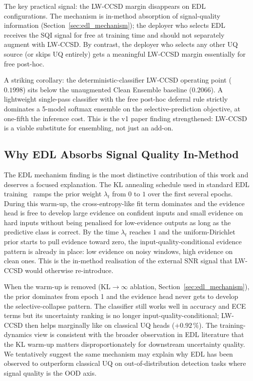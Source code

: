 \documentclass[journal]{IEEEtran}
\begin{document}
The key practical signal: the LW-CCSD margin disappears on EDL configurations. The mechanism is in-method absorption of signal-quality information (Section~\ref{sec:edl_mechanism}); the deployer who selects EDL receives the SQI signal for free at training time and should not separately augment with LW-CCSD. By contrast, the deployer who selects any other UQ source (or skips UQ entirely) gets a meaningful LW-CCSD margin essentially for free post-hoc.

A striking corollary: the deterministic-classifier LW-CCSD operating point ($0.1998$) sits below the unaugmented Clean Ensemble baseline ($0.2066$). A lightweight single-pass classifier with the free post-hoc deferral rule strictly dominates a 5-model softmax ensemble on the selective-prediction objective, at one-fifth the inference cost. This is the v1 paper finding strengthened: LW-CCSD is a viable substitute for ensembling, not just an add-on.

\subsection{Why EDL Absorbs Signal Quality In-Method}
The EDL mechanism finding is the most distinctive contribution of this work and deserves a focused explanation. The KL annealing schedule used in standard EDL training~\cite{sensoy2018evidential} ramps the prior weight $\lambda_t$ from $0$ to $1$ over the first several epochs. During this warm-up, the cross-entropy-like fit term dominates and the evidence head is free to develop large evidence on confident inputs and small evidence on hard inputs without being penalised for low-evidence outputs as long as the predictive class is correct. By the time $\lambda_t$ reaches $1$ and the uniform-Dirichlet prior starts to pull evidence toward zero, the input-quality-conditional evidence pattern is already in place: low evidence on noisy windows, high evidence on clean ones. This is the in-method realisation of the external SNR signal that LW-CCSD would otherwise re-introduce.

When the warm-up is removed (KL$\to\infty$ ablation, Section~\ref{sec:edl_mechanism}), the prior dominates from epoch 1 and the evidence head never gets to develop the selective-collapse pattern. The classifier still works well in accuracy and ECE terms but its uncertainty ranking is no longer input-quality-conditional; LW-CCSD then helps marginally like on classical UQ heads ($+0.92\,\%$). The training-dynamics view is consistent with the broader observation in EDL literature that the KL warm-up matters disproportionately for downstream uncertainty quality. We tentatively suggest the same mechanism may explain why EDL has been observed to outperform classical UQ on out-of-distribution detection tasks where signal quality is the OOD axis.
\end{document}

